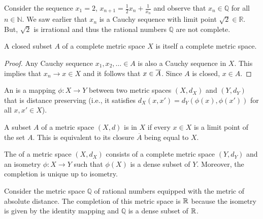 
\begin{example}
Consider the sequence $x_1 = 2$, $x_{n+1} = \frac{1}{2}x_n + \frac{1}{x_n}$ and observe that $x_n \in \mathbb{Q}$ for all $n\in \mathbb{N}$.
We saw earlier that $x_n$ is a Cauchy sequence with limit point $\sqrt{2} \in \mathbb{R}$.
But, $\sqrt{2}$ is irrational and thus the rational numbers $\mathbb{Q}$ are not complete.
\end{example}

\begin{theorem}
A closed subset $A$ of a complete metric space $X$ is itself a complete metric space.
\end{theorem}
\begin{proof}
Any Cauchy sequence $x_1,x_2,\ldots \in A$ is also a Cauchy sequence in $X$.
This implies that $x_n \to x \in X$ and it follows that $x \in \overline{A}$.
Since $A$ is closed, $x\in A$.
\end{proof}

\begin{definition}
An  is a mapping $\phi  \colon X \rightarrow Y$ between two metric spaces $(X,d_X)$ and $(Y,d_Y)$ that is distance preserving (i.e., it satisfies $d_X (x,x') = d_Y \left(\phi(x),\phi(x')\right)$ for all $x,x'\in X$).
\end{definition}

\begin{definition}
A subset $A$ of a metric space $(X,d)$ is  in $X$ if every $x\in X$ is a limit point of the set $A$.
This is equivalent to its closure $\overline{A}$ being equal to $X$.
\end{definition}

\begin{definition}
The  of a metric space $(X,d_X)$ consists of a complete metric space $(Y,d_Y)$ and an isometry $\phi  \colon X \rightarrow Y$ such that $\phi(X)$ is a dense subset of $Y$.
Moreover, the completion is unique up to isometry.
\end{definition}

\begin{example}
Consider the metric space $\mathbb{Q}$ of rational numbers equipped with the metric of absolute distance.
The completion of this metric space is $\mathbb{R}$ because the isometry is given by the identity mapping and $\mathbb{Q}$ is a dense subset of $\mathbb{R}$.
\end{example}

